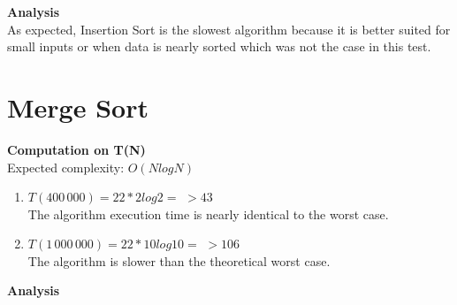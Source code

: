 \documentclass{article}
\begin{document}
\textbf{Analysis}\\

As expected, Insertion Sort is the slowest algorithm  because it is better suited for small inputs or when data is nearly sorted which was not the case in this test.

\newpage
\section{Merge Sort}

\begin{center}
\end{center}

\textbf{Computation on T(N)}\\

Expected complexity: $O(NlogN)$\\

\begin{enumerate}
    \item $T(400\,000) = 22 *2 log 2 =$
    $> 43$\\
    The algorithm execution time is nearly identical to the worst case.
    
    \item $T(1\,000\,000) = 22 *10 log 10 =$
    $> 106$\\
    The algorithm is slower than the theoretical worst case.
    
\end{enumerate}

\textbf{Analysis}\\
\end{document}
